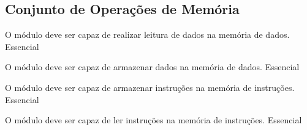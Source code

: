 \subsection{Conjunto de Operações de Memória}

	  \begin{functional}
		{O módulo deve ser capaz de realizar leitura de dados na memória de dados.}
		{Essencial}
		
        {O módulo deve ser capaz de armazenar dados na memória de dados.}
        {Essencial}

		{O módulo deve ser capaz de armazenar instruções na memória de instruções.}
		{Essencial}
		
		{O módulo deve ser capaz de ler instruções na memória de instruções.}
		{Essencial}
	
		 
	 \end{functional}